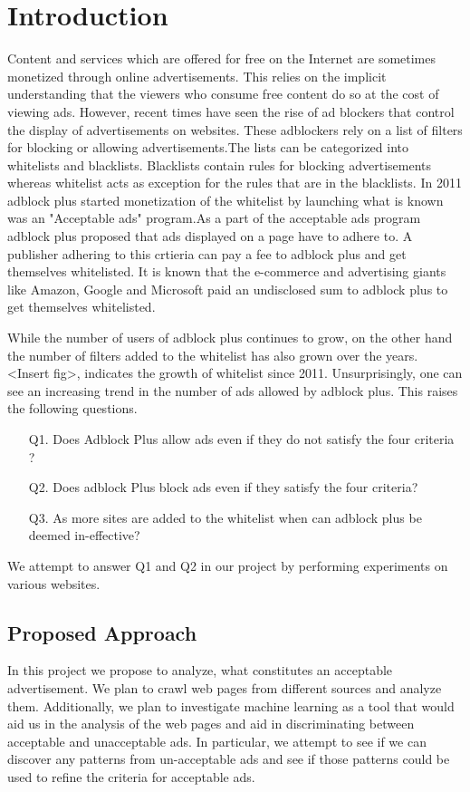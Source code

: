 \section{Introduction}
Content and services which are offered for free on the Internet are sometimes monetized through online advertisements. This relies on the implicit understanding that the viewers who consume free content do so at the cost of viewing ads. However, recent times have seen the  rise of ad blockers that control the display of  advertisements on websites. These adblockers rely on  a list of filters for blocking or allowing advertisements.The lists can be categorized into whitelists and blacklists. Blacklists contain rules for blocking advertisements whereas whitelist acts as exception for the rules that are in the blacklists.
In 2011 adblock plus started monetization of the whitelist by launching what is known was an "Acceptable ads" program.As a part of the acceptable ads program adblock plus proposed  that ads  displayed on a page have to adhere to. A publisher adhering to this crtieria can pay a fee to adblock plus and get themselves whitelisted. It is known that the e-commerce and advertising giants like Amazon, Google and Microsoft paid an undisclosed sum to adblock plus to get themselves whitelisted.

While the number of users of adblock plus continues to grow, on the other hand the number of filters added to the whitelist has also grown over the years.
<Insert fig>, indicates the growth of whitelist since 2011. Unsurprisingly, one can see an increasing trend in the number of ads allowed by adblock plus. This raises
the following questions.
\begin{itemize}
\item [Q1.] Does Adblock Plus allow ads even if they do not satisfy the four criteria ?
\item [Q2.] Does adblock Plus block ads even if they satisfy the four criteria?
\item [Q3.] As more sites are added to the whitelist when can adblock plus be deemed in-effective?
\end{itemize}

We attempt to answer Q1 and Q2 in our project by performing experiments on various websites.
\subsection{Proposed Approach}
In this project we propose to analyze, what  constitutes an acceptable advertisement. We plan to crawl web pages from different sources and analyze them. Additionally, we plan to investigate machine learning as a tool that would aid us in the analysis of the web pages and aid in discriminating between acceptable and unacceptable ads. In particular, we attempt to see if we can discover any patterns from  un-acceptable ads and see if those patterns could  be used to refine the criteria for acceptable ads.


